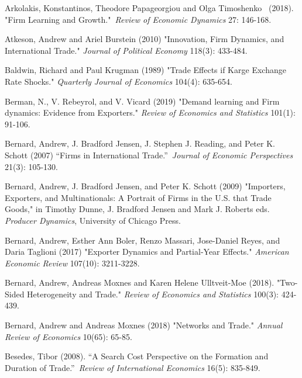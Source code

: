 \documentclass[12pt]{article}
\begin{document}
\begin{description}
\item Arkolakis, Konstantinos, Theodore Papageorgiou and Olga Timoshenko \
(2018). "Firm Learning and Growth."\textit{\ Review of Economic Dynamics}
27: 146-168.

\item Atkeson, Andrew and Ariel Burstein (2010) "Innovation, Firm Dynamics,
and International Trade." \textit{Journal of Political Economy} 118(3):
433-484.

\item Baldwin, Richard and Paul Krugman (1989) "Trade Effects if Karge
Exchange Rate Shocks." \textit{Quarterly Journal of Economics} 104(4):
635-654.

\item Berman, N., V. Rebeyrol, and V. Vicard (2019) "Demand learning and
Firm dynamics: Evidence from Exporters." \textit{Review of Economics and
Statistics} 101(1): 91-106.

\item Bernard, Andrew, J. Bradford Jensen, J. Stephen J. Reading, and Peter
K. Schott (2007) \textquotedblleft Firms in International
Trade.\textquotedblright\ \textit{Journal of Economic Perspectives} 21(3):
105-130.

\item Bernard, Andrew, J. Bradford Jensen, and Peter K. Schott (2009) "Importers, Exporters, and Multinationals: A Portrait of Firms in the U.S. that Trade Goods," in Timothy Dunne, J. Bradford Jensen and Mark J. Roberts eds. \textit{Producer Dynamics}, University of Chicago Press.

\item Bernard, Andrew,  Esther Ann Boler, Renzo Massari, Jose-Daniel Reyes, and 
Daria Taglioni  (2017) "Exporter Dynamics and Partial-Year Effects."
 \textit{American Economic Review }107(10): 3211-3228.

\item Bernard, Andrew, Andreas Moxnes and Karen Helene Ulltveit-Moe (2018).
"Two-Sided Heterogeneity and Trade." \textit{Review of Economics and
Statistics }100(3): 424-439.

\item Bernard, Andrew and Andreas Moxnes (2018) "Networks and Trade." 
\textit{Annual Review of Economics} 10(65): 65-85.

\item Besedes, Tibor (2008). \textquotedblleft A Search Cost Perspective on the
Formation and Duration of Trade.\textquotedblright\ \textit{Review of International Economics} 16(5): 835-849.


\end{description}
\end{document}
